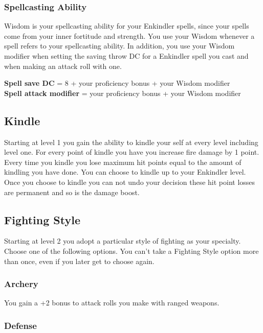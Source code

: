 \subsubsection{Spellcasting Ability}
Wisdom is your spellcasting ability for your Enkindler spells, since your spells come from your inner fortitude and strength. You use your Wisdom whenever a spell refers to your spellcasting ability. In addition, you use your Wisdom modifier when setting the saving throw DC for a Enkindler spell you cast and when making an attack roll with one.

\begin{center}
\textbf{Spell save DC} = 8 + your proficiency bonus + your Wisdom modifier\\
\textbf{Spell attack modifier} = your proficiency bonus + your Wisdom modifier
\end{center}

\subsection{Kindle}

Starting at level 1 you gain the ability to kindle your self at every level including level one. For every point of kindle you have you increase fire damage by 1 point. Every time you kindle you lose maximum hit points equal to the amount of kindling you have done. You can choose to kindle up to your Enkindler level. Once you choose to kindle you can not undo your decision these hit point losses are permanent and so is the damage boost.

\subsection{Fighting Style}

Starting at level 2 you adopt a particular style of fighting as your specialty. Choose one of the following options. You can’t take a Fighting Style option more than once, even if you later get to choose again.

\subsubsection{Archery}

You gain a +2 bonus to attack rolls you make with ranged weapons.

\subsubsection{Defense}

